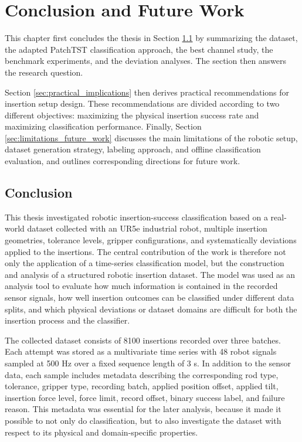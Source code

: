 \chapter{Conclusion and Future Work}\label{ch:conclusion}
This chapter first concludes the thesis in Section \ref{sec:conclusion} by summarizing the dataset, the adapted PatchTST classification approach, the best channel study, the benchmark experiments, and the deviation analyses. The section then answers the research question.

Section \ref{sec:practical_implications} then derives practical recommendations for insertion setup design. These recommendations are divided according to two different objectives: maximizing the physical insertion success rate and maximizing classification performance. Finally, Section \ref{sec:limitations_future_work} discusses the main limitations of the robotic setup, dataset generation strategy, labeling approach, and offline classification evaluation, and outlines corresponding directions for future work.


\section{Conclusion}
\label{sec:conclusion}

This thesis investigated robotic insertion-success classification based on a real-world dataset collected with an UR5e industrial robot, multiple insertion geometries, tolerance levels, gripper configurations, and systematically deviations applied to the insertions. The central contribution of the work is therefore not only the application of a time-series classification model, but the construction and analysis of a structured robotic insertion dataset. The model was used as an analysis tool to evaluate how much information is contained in the recorded sensor signals, how well insertion outcomes can be classified under different data splits, and which physical deviations or dataset domains are difficult for both the insertion process and the classifier.

The collected dataset consists of 8100 insertions recorded over three batches. Each attempt was stored as a multivariate time series with 48 robot signals sampled at 500 Hz over a fixed sequence length of 3 s. In addition to the sensor data, each sample includes metadata describing the corresponding rod type, tolerance, gripper type, recording batch, applied position offset, applied tilt, insertion force level, force limit, record offset, binary success label, and failure reason. This metadata was essential for the later analysis, because it made it possible to not only do classification, but to also investigate the dataset with respect to its physical and domain-specific properties.

